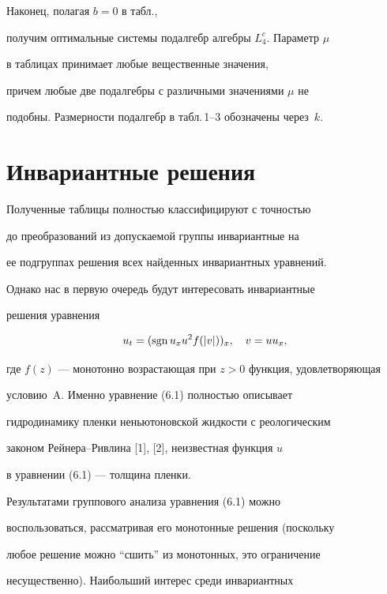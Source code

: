 Наконец, полагая $b=0$ в табл., 


получим оптимальные системы подалгебр алгебры $L^c_4$. Параметр $\mu$ 


в таблицах принимает любые вещественные значения, 


причем любые две подалгебры с различными значениями $\mu$ не 


подобны. Размерности подалгебр в табл.\,1--3 обозначены через~$k$. 


 


\section{Инвариантные решения} 


 


Полученные таблицы полностью классифицируют с точностью  


до преобразований из допускаемой группы инвариантные на  


ее подгруппах решения всех найденных инвариантных уравнений.  


Однако нас в первую очередь будут интересовать инвариантные  


решения уравнения 


\begin{equation} 


u_t=(\sgn u_x u^2f(|v|))_x,\quad v=uu_x, 


\end{equation} 


где $f(z)$ --- монотонно возрастающая при $z>0$ функция, удовлетворяющая  


условию~A. Именно уравнение (6.1) полностью описывает  


гидродинамику пленки неньютоновской жидкости с реологическим  


законом Рейнера--Ривлина [1], [2], неизвестная функция $u$  


в уравнении (6.1) --- толщина пленки. 


 


Результатами группового анализа уравнения (6.1) можно  


воспользоваться, рассматривая его монотонные решения (поскольку  


любое решение можно ``сшить'' из монотонных, это ограничение  


несущественно). Наибольший интерес среди инвариантных  


